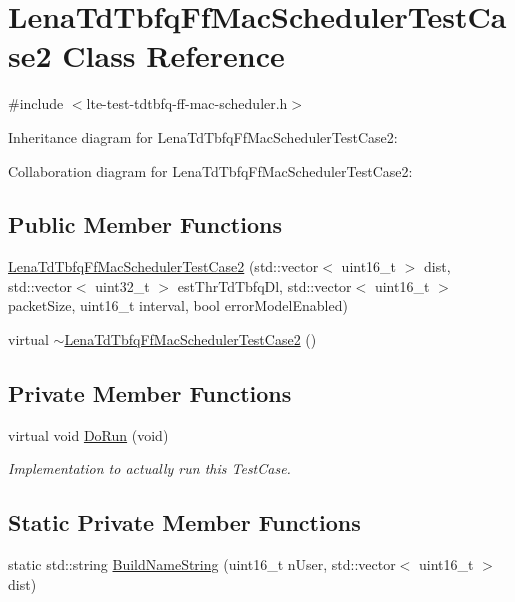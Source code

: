 \hypertarget{classLenaTdTbfqFfMacSchedulerTestCase2}{}\section{Lena\+Td\+Tbfq\+Ff\+Mac\+Scheduler\+Test\+Case2 Class Reference}
\label{classLenaTdTbfqFfMacSchedulerTestCase2}


{\ttfamily \#include $<$lte-\/test-\/tdtbfq-\/ff-\/mac-\/scheduler.\+h$>$}



Inheritance diagram for Lena\+Td\+Tbfq\+Ff\+Mac\+Scheduler\+Test\+Case2\+:


Collaboration diagram for Lena\+Td\+Tbfq\+Ff\+Mac\+Scheduler\+Test\+Case2\+:
\subsection*{Public Member Functions}
\begin{DoxyCompactItemize}
\item 
\hyperlink{classLenaTdTbfqFfMacSchedulerTestCase2_aada49ffbd30a54d68dac70cc64f56ade}{Lena\+Td\+Tbfq\+Ff\+Mac\+Scheduler\+Test\+Case2} (std\+::vector$<$ uint16\+\_\+t $>$ dist, std\+::vector$<$ uint32\+\_\+t $>$ est\+Thr\+Td\+Tbfq\+Dl, std\+::vector$<$ uint16\+\_\+t $>$ packet\+Size, uint16\+\_\+t interval, bool error\+Model\+Enabled)
\item 
virtual \hyperlink{classLenaTdTbfqFfMacSchedulerTestCase2_a639c08802d9de3800a52822c485d5f67}{$\sim$\+Lena\+Td\+Tbfq\+Ff\+Mac\+Scheduler\+Test\+Case2} ()
\end{DoxyCompactItemize}
\subsection*{Private Member Functions}
\begin{DoxyCompactItemize}
\item 
virtual void \hyperlink{classLenaTdTbfqFfMacSchedulerTestCase2_a4029c5006bf9136e36d90101934b1db0}{Do\+Run} (void)
\begin{DoxyCompactList}\small\item\em Implementation to actually run this Test\+Case. \end{DoxyCompactList}\end{DoxyCompactItemize}
\subsection*{Static Private Member Functions}
\begin{DoxyCompactItemize}
\item 
static std\+::string \hyperlink{classLenaTdTbfqFfMacSchedulerTestCase2_a0670bb9e9097f4be44c42e6056d8606e}{Build\+Name\+String} (uint16\+\_\+t n\+User, std\+::vector$<$ uint16\+\_\+t $>$ dist)
\end{DoxyCompactItemize}
